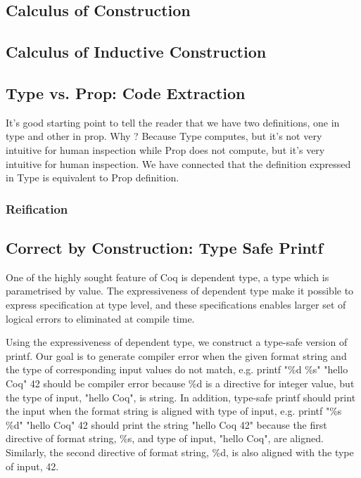 \subsection{Calculus of Construction}
\label{sec:cc}
\subsection{Calculus of Inductive Construction}
\label{sec:cic}
 
 
\subsection{Type vs. Prop: Code Extraction}
\label{sec:typeprop}
  It's good starting point to tell the reader that we have two definitions, 
  one in type and other in prop. Why ? Because Type computes, but it's
  not very intuitive for human inspection while Prop does not compute, 
  but it's very intuitive for human inspection. We have connected that 
  the definition expressed in Type is equivalent to Prop definition. 
  
  \subsubsection{Reification}
  \label{sec:reification}
    
 \subsection{Correct by Construction: Type Safe Printf}
 \label{sec:deplambda}
  One of the highly sought feature of Coq is dependent type, 
  a type which is parametrised by value.  
  The expressiveness of dependent type make it possible
  to express specification at type level, and these specifications enables larger 
  set of  logical errors to eliminated at compile time. 
  
 
 Using the expressiveness of dependent type, we construct a type-safe version of 
 printf. Our goal is to generate compiler error when the given format string and the type of 
 corresponding input values  
 do not match, e.g. printf "\%d \%s" "hello Coq" 42 should be compiler error because
 \%d is a directive for integer value, but the type of input, "hello Coq", is string. In addition, 
 type-safe printf should print the input when the format string is aligned with type of input, e.g.
 printf "\%s \%d" "hello Coq" 42 should print the string "hello Coq  42" because the first directive 
 of format string, \%s, and type of input, "hello Coq", are aligned. Similarly, the second directive 
 of format string, \%d, is also aligned with the type of input, 42.
 
